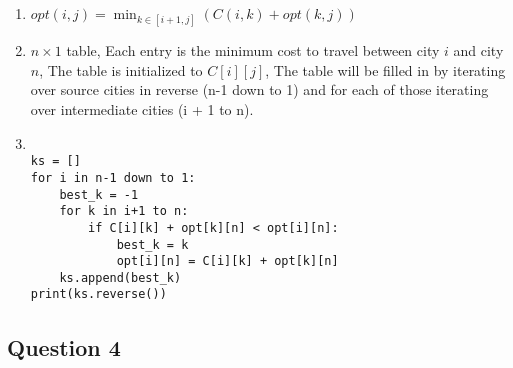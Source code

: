 \documentclass[11pt]{article}
\begin{document}
\begin{enumerate}
    \item $opt(i, j) = \min_{k \in [i + 1, j]} (C(i, k) + opt(k, j))$
    \item $n \times 1$ table, Each entry is the minimum cost to travel between city $i$ and city $n$, The table is initialized to $C[i][j]$, The table will be filled in by iterating over source cities in reverse (n-1 down to 1) and for each of those iterating over intermediate cities (i + 1 to n).
    \item
          \begin{verbatim}

ks = []
for i in n-1 down to 1:
    best_k = -1
    for k in i+1 to n:
        if C[i][k] + opt[k][n] < opt[i][n]:
            best_k = k
            opt[i][n] = C[i][k] + opt[k][n]
    ks.append(best_k)
print(ks.reverse())
\end{verbatim}
\end{enumerate}

\subsection{Question 4}
\end{document}
